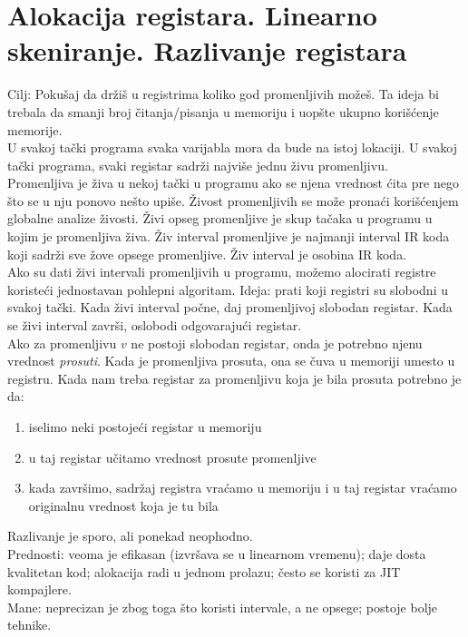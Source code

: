 \documentclass[10pt]{extarticle}
\begin{document}
\section{Alokacija registara. Linearno skeniranje. Razlivanje registara}
\noindent
Cilj: Pokušaj da držiš u registrima koliko god promenljivih možeš. Ta ideja bi trebala da smanji broj čitanja/pisanja u memoriju i uopšte ukupno korišćenje memorije. \\
U svakoj tački programa svaka varijabla mora da bude na istoj lokaciji. U svakoj tački programa, svaki registar sadrži najviše jednu živu promenljivu. \\
Promenljiva je živa u nekoj tački u programu ako se njena vrednost ćita pre nego što se u nju ponovo nešto upiše. Živost promenljivih se može pronaći korišćenjem globalne analize živosti. Živi opseg promenljive je skup tačaka u programu u kojim je promenljiva živa. Živ interval promenljive je najmanji interval IR koda koji sadrži sve žove opsege promenljive. Živ interval je osobina IR koda. \\
Ako su dati živi intervali promenljivih u programu, možemo alocirati registre koristeći jednostavan pohlepni algoritam. Ideja: prati koji registri su slobodni u svakoj tački. Kada živi interval počne, daj promenljivoj slobodan registar. Kada se živi interval završi, oslobodi odgovarajući registar.\\
Ako za promenljivu $v$ ne postoji slobodan registar, onda je potrebno njenu vrednost \textit{prosuti}. Kada je promenljiva prosuta, ona se čuva u memoriji umesto u registru. Kada nam treba registar za promenljivu koja je bila prosuta potrebno je da:
\begin{enumerate}
    \item iselimo neki postojeći registar u memoriju
    \item u taj registar učitamo vrednost prosute promenljive
    \item kada završimo, sadržaj registra vraćamo u memoriju i u taj registar vraćamo originalnu vrednost koja je tu bila
\end{enumerate}
Razlivanje je sporo, ali ponekad neophodno. \\
Prednosti: veoma je efikasan (izvršava se u linearnom vremenu); daje dosta kvalitetan kod; alokacija radi u jednom prolazu; često se koristi za JIT kompajlere.\\
Mane: neprecizan je zbog toga što koristi intervale, a ne opsege; postoje bolje tehnike.
\end{document}
